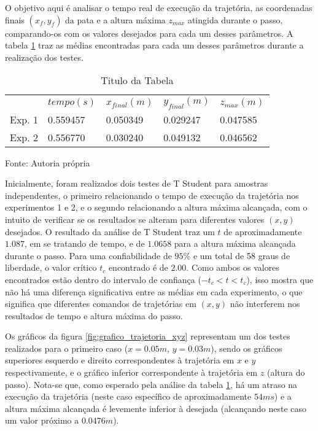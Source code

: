 \documentclass[../main.tex]{subfiles}
\begin{document}
  O objetivo aqui é analisar o tempo real de execução da trajetória, as coordenadas finais $(x_f, y_f)$ da pata e a altura máxima $z_{max}$ atingida durante o passo, comparando-os com os valores desejados para cada um desses parâmetros. A tabela \ref{tab:trajetoria} traz as médias encontradas para cada um desses parâmetros durante a realização dos testes.

  \begin{table}[h]
    \caption{Titulo da Tabela}
    \centering
      \begin{tabular}{lllll}
             & $tempo (s)$ & $x_{final}(m)$ & $y_{final}(m)$ & $z_{max}(m)$ \\
      Exp. 1 & 0.559457 & 0.050349 & 0.029247 & 0.047585 \\
      Exp. 2 & 0.556770 & 0.030240 & 0.049132 & 0.046562      
      \end{tabular}

    Fonte: Autoria própria
    \label{tab:trajetoria}
  \end{table}

  Inicialmente, foram realizados dois testes de T Student para amostras independentes, o primeiro relacionando o tempo de execução da trajetória nos experimentos 1 e 2, e o segundo relacionando a altura máxima alcançada, com o intuito de verificar se os resultados se alteram para diferentes valores $(x, y)$ desejados. O resultado da análise de T Student traz um $t$ de aproximadamente $1.087$, em se tratando de tempo, e de $1.0658$ para a altura máxima alcançada durante o passo. Para uma confiabilidade de $95\%$ e um total de 58 graus de liberdade, o valor crítico $t_c$ encontrado é de $2.00$. Como ambos os valores encontrados estão dentro do intervalo de confiança ($-t_c < t < t_c$), isso mostra que não há uma diferença significativa entre as médias em cada experimento, o que significa que diferentes comandos de trajetórias em $(x, y)$ não interferem nos resultados de tempo e altura máxima do passo.
  
  Os gráficos da figura \ref{fig:grafico_trajetoria_xyz} representam um dos testes realizados para o primeiro caso ($x=0.05m$, $y=0.03m$), sendo os gráficos superiores esquerdo e direito correspondentes à trajetória em $x$ e $y$ respectivamente, e o gráfico inferior correspondente à trajetória em $z$ (altura do passo). Nota-se que, como esperado pela análise da tabela \ref{tab:trajetoria}, há um atraso na execução da trajetória (neste caso específico de aproximadamente $54ms$) e a altura máxima alcançada é levemente inferior à desejada (alcançando neste caso um valor próximo a $0.0476m$).
\end{document}
